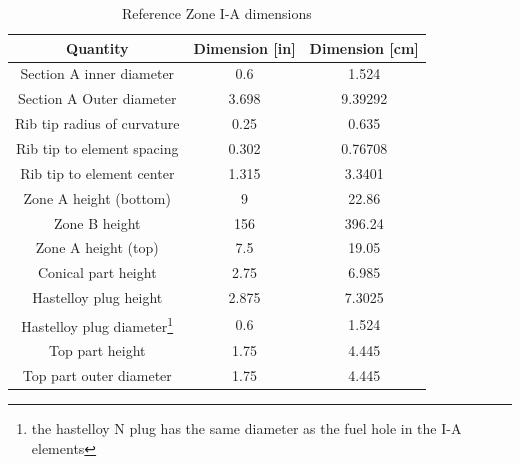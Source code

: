 \begin{table}[htpb]
    \centering
    \caption{Reference Zone I-A dimensions}
    \label{tab:zone-ia-ref-specs}
    \begin{tabulary}{\linewidth}{|C|C|C|}
    \hline
    Quantity & Dimension [in] & Dimension [\unit{\centi\metre}]\\
    \hline
    Section A inner diameter & 0.6 & 1.524 \\
    \hline
    Section A Outer diameter & 3.698 & 9.39292 \\
    \hline
    Rib tip radius of curvature & 0.25 & 0.635 \\
    \hline
    Rib tip to element spacing & 0.302 & 0.76708 \\
    \hline
    Rib tip to element center & 1.315 & 3.3401 \\
    \hline
    Zone A height (bottom) & 9 & 22.86\\
    \hline
    Zone B height & 156 & 396.24 \\
    \hline
    Zone A height (top) & 7.5 & 19.05 \\
    \hline
    Conical part height & 2.75 & 6.985 \\
    \hline
    Hastelloy plug height & 2.875 & 7.3025 \\
    \hline
    Hastelloy plug diameter\footnote{the hastelloy N plug has the same diameter as the fuel hole in the I-A elements} & 0.6 & 1.524 \\
    \hline
    Top part height & 1.75 & 4.445 \\
    \hline
    Top part outer diameter & 1.75 & 4.445 \\
    \hline
    \end{tabulary}
\end{table}


